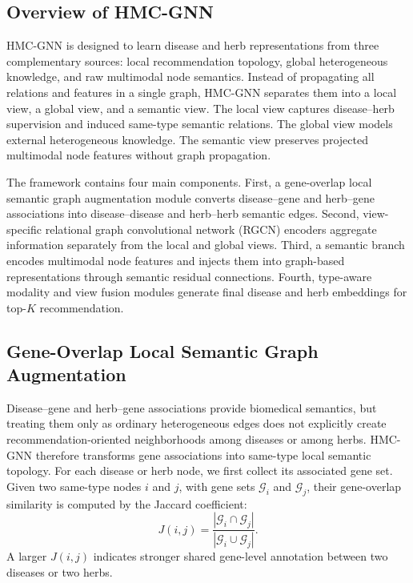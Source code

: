 \documentclass[journal,twoside,web]{ieeecolor}
\begin{document}
\subsection{Overview of HMC-GNN}
\label{subsec:method_overview}

HMC-GNN is designed to learn disease and herb representations from three complementary sources: local recommendation topology, global heterogeneous knowledge, and raw multimodal node semantics. Instead of propagating all relations and features in a single graph, HMC-GNN separates them into a local view, a global view, and a semantic view. The local view captures disease--herb supervision and induced same-type semantic relations. The global view models external heterogeneous knowledge. The semantic view preserves projected multimodal node features without graph propagation.

The framework contains four main components. First, a gene-overlap local semantic graph augmentation module converts disease--gene and herb--gene associations into disease--disease and herb--herb semantic edges. Second, view-specific relational graph convolutional network (RGCN) encoders aggregate information separately from the local and global views. Third, a semantic branch encodes multimodal node features and injects them into graph-based representations through semantic residual connections. Fourth, type-aware modality and view fusion modules generate final disease and herb embeddings for top-$K$ recommendation.

\subsection{Gene-Overlap Local Semantic Graph Augmentation}
\label{subsec:gene_overlap}

Disease--gene and herb--gene associations provide biomedical semantics, but treating them only as ordinary heterogeneous edges does not explicitly create recommendation-oriented neighborhoods among diseases or among herbs. HMC-GNN therefore transforms gene associations into same-type local semantic topology. For each disease or herb node, we first collect its associated gene set. Given two same-type nodes $i$ and $j$, with gene sets $\mathcal{G}_i$ and $\mathcal{G}_j$, their gene-overlap similarity is computed by the Jaccard coefficient:
\begin{equation}
J(i,j)=\frac{|\mathcal{G}_i\cap\mathcal{G}_j|}
{|\mathcal{G}_i\cup\mathcal{G}_j|}.
\label{eq:jaccard}
\end{equation}
A larger $J(i,j)$ indicates stronger shared gene-level annotation between two diseases or two herbs.
\end{document}
